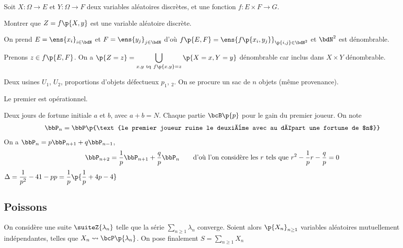 \documentclass[a4paper,french,bookmarks]{book}
\begin{document}
    \newpage
    
    Soit $X : \Omega \to E$ et $Y : \Omega \to F$ deux variables aléatoires discrètes, et une fonction $f : E \times F \to G$.
    
    Montrer que $Z = f\p{X, y}$ est une variable aléatoire discrète.\bigskip
    
    On prend $E = \ens{x_i}_{i \in \bdN}$ et $F = \ens{y_j}_{j \in \bdN}$ d'où $f\p{E, F} = \ens{f\p{x_i, y_j}}_{\p{i, j} \in \bdN^2}$ et $\bdN^2$ est dénombrable.
    
    Prenons $z \in f\p{E, F}$. On a $\p{Z = z} = \displaystyle\bigcup_{x, y \ \text{tq} \ f\p{x, y} = z} \p{X =x, Y = y}$ dénombrable car inclus dans $X \times Y$ dénombrable.\newpage
    
    Deux usines $U_1$, $U_2$, proportions d'objets défectueux $p_1$, $_2$. On se procure un sac de $n$ objets (même provenance). 
    
    Le premier est opérationnel.\newpage
    
    Deux jours de fortune initiale $a$ et $b$, avec $a + b = N$. Chaque partie $\bcB\p{p}$ pour le gain du premier joueur. On note 
    \[ \bbP_n = \bbP\p{\text{le premier joueur ruine le deuxième avec au départ une fortune de $n$}} \]
    On a $\bbP_n = p\bbP_{n+1} + q\bbP_{n-1}$, \ie 
    \[\bbP_{n+2} = \dfrac{1}{p}\bbP_{n+1} + \dfrac{q}{p}\bbP_n \qquad\text{d'où l'on considère les $r$ tels que}\ r^2 - \dfrac{1}{p}r - \dfrac{q}{p} = 0\]
    $\Delta = \dfrac{1}{p^2} - 4{1-p}{p} = \dfrac{1}{p}\p{\dfrac{1}{p} + 4p - 4}$
    
    \newpage
    
    \subsection*{Poissons}
    
    On considère une suite $\suiteZ{\lambda_n}$ telle que la série $\sum\limits_{n \geq 1} \lambda_n$ converge. Soient alors $\p{X_n}_{n \geq 1}$ variables aléatoires mutuellement indépendantes, telles que $X_n \rightsquigarrow \bcP\p{\lambda_n}$. On pose finalement $S = \sum\limits_{n \geq 1} X_n$
    
\end{document}
